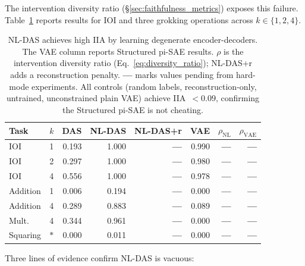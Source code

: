 \documentclass{article}
\begin{document}
The intervention diversity ratio (\S\ref{sec:faithfulness_metrics}) exposes this
failure. Table~\ref{tab:nldas_vacuous} reports results for IOI and three
grokking operations across $k \in \{1, 2, 4\}$.

\begin{table}[t]
\centering
\small
\setlength{\tabcolsep}{3pt}
\begin{tabular}{lc rrrr rr}
\toprule
Task & $k$ & DAS & NL-DAS & NL-DAS+r & VAE & $\rho_\text{NL}$ & $\rho_\text{VAE}$ \\
\midrule
IOI & 1 & 0.193 & 1.000 & \textbf{---} & 0.990 & \textbf{---} & \textbf{---} \\
IOI & 2 & 0.297 & 1.000 & \textbf{---} & 0.980 & \textbf{---} & \textbf{---} \\
IOI & 4 & 0.556 & 1.000 & \textbf{---} & 0.978 & \textbf{---} & \textbf{---} \\
Addition & 1 & 0.006 & 0.194 & \textbf{---} & 0.000 & \textbf{---} & \textbf{---} \\
Addition & 4 & 0.289 & 0.883 & \textbf{---} & 0.089 & \textbf{---} & \textbf{---} \\
Mult.\ & 4 & 0.344 & 0.961 & \textbf{---} & 0.000 & \textbf{---} & \textbf{---} \\
Squaring & $*$ & 0.000 & 0.011 & \textbf{---} & 0.000 & \textbf{---} & \textbf{---} \\
\bottomrule
\end{tabular}
\caption{NL-DAS achieves high IIA by learning degenerate encoder-decoders.
  The VAE column reports Structured pi-SAE results.
  $\rho$ is the intervention diversity ratio (Eq.~\ref{eq:diversity_ratio});
  NL-DAS+r adds a reconstruction penalty.
  \textbf{---} marks values pending from hard-mode experiments.
  All controls (random labels, reconstruction-only, untrained, unconstrained
  plain VAE) achieve IIA~$< 0.09$, confirming the Structured pi-SAE is not
  cheating.}
\label{tab:nldas_vacuous}
\end{table}

Three lines of evidence confirm NL-DAS is vacuous:
\end{document}
